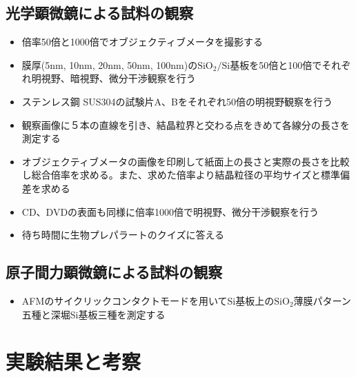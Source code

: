 \documentclass{jsarticle}
\begin{document}
\subsection{光学顕微鏡による試料の観察}
\begin{itemize}
\item 倍率50倍と1000倍でオブジェクティブメータを撮影する
\item 膜厚(5nm, 10nm, 20nm, 50nm, 100nm)の$\mathrm{SiO_2/Si}$基板を50倍と100倍でそれぞれ明視野、暗視野、微分干渉観察を行う
\item ステンレス鋼 SUS304の試験片A、Bをそれぞれ50倍の明視野観察を行う
\item 観察画像に５本の直線を引き、結晶粒界と交わる点をきめて各線分の長さを測定する
\item オブジェクティブメータの画像を印刷して紙面上の長さと実際の長さを比較し総合倍率を求める。また、求めた倍率より結晶粒径の平均サイズと標準偏差を求める
\item CD、DVDの表面も同様に倍率1000倍で明視野、微分干渉観察を行う
\item 待ち時間に生物プレパラートのクイズに答える
\end{itemize}
\subsection{原子間力顕微鏡による試料の観察}
\begin{itemize}
\item AFMのサイクリックコンタクトモードを用いてSi基板上の$\mathrm{SiO_2}$薄膜パターン五種と深堀Si基板三種を測定する
\end{itemize}
\section{実験結果と考察}
\end{document}
